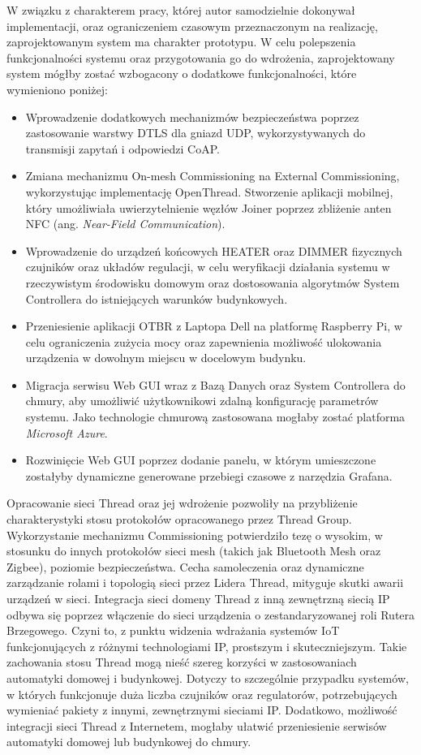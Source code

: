 W związku z charakterem pracy, której autor samodzielnie dokonywał implementacji, oraz ograniczeniem czasowym przeznaczonym na realizację, zaprojektowanym system ma charakter prototypu. W celu polepszenia funkcjonalności systemu oraz przygotowania go do wdrożenia,
zaprojektowany system mógłby zostać wzbogacony o dodatkowe funkcjonalności, które wymieniono poniżej:
\begin{itemize}
    \item Wprowadzenie dodatkowych mechanizmów bezpieczeństwa poprzez zastosowanie warstwy DTLS dla gniazd UDP, wykorzystywanych do transmisji zapytań i odpowiedzi CoAP. 
    \item Zmiana mechanizmu On-mesh Commissioning na External Commissioning, wykorzystując implementację  OpenThread. Stworzenie aplikacji mobilnej, który umożliwiała uwierzytelnienie węzłów Joiner poprzez zbliżenie anten NFC (ang. \textit{Near-Field Communication}).
    \item Wprowadzenie do urządzeń końcowych HEATER oraz DIMMER fizycznych czujników oraz układów regulacji, w celu weryfikacji działania systemu w rzeczywistym środowisku domowym oraz dostosowania algorytmów System Controllera do istniejących warunków budynkowych.
    \item Przeniesienie aplikacji OTBR z Laptopa Dell na platformę Raspberry Pi, w celu ograniczenia zużycia mocy oraz zapewnienia możliwość ulokowania urządzenia w dowolnym miejscu w docelowym budynku.
    \item Migracja serwisu Web GUI wraz z Bazą Danych oraz System Controllera do chmury, aby umożliwić użytkownikowi zdalną konfigurację parametrów systemu. Jako technologie chmurową zastosowana mogłaby zostać platforma \textit{Microsoft Azure}.
    \item Rozwinięcie Web GUI poprzez dodanie panelu, w którym umieszczone zostałyby dynamiczne generowane przebiegi czasowe z narzędzia Grafana.
\end{itemize}

Opracowanie sieci Thread oraz jej wdrożenie pozwoliły na przybliżenie charakterystyki stosu protokołów opracowanego przez Thread Group. Wykorzystanie mechanizmu Commissioning potwierdziło tezę o wysokim, w stosunku do innych protokołów sieci mesh (takich jak Bluetooth Mesh oraz Zigbee), poziomie bezpieczeństwa. Cecha samoleczenia oraz dynamiczne zarządzanie rolami i topologią sieci przez Lidera Thread, mityguje skutki awarii urządzeń w sieci. Integracja sieci domeny Thread z inną zewnętrzną siecią IP odbywa się poprzez włączenie do sieci urządzenia o zestandaryzowanej roli Rutera Brzegowego. Czyni to, z punktu widzenia wdrażania systemów IoT funkcjonujących z różnymi technologiami IP, prostszym i skuteczniejszym. Takie zachowania stosu Thread mogą nieść szereg korzyści w zastosowaniach automatyki domowej i budynkowej. Dotyczy to szczególnie przypadku systemów, w których funkcjonuje duża liczba czujników oraz regulatorów, potrzebujących wymieniać pakiety z innymi, zewnętrznymi sieciami IP. Dodatkowo, możliwość integracji sieci Thread z Internetem, mogłaby ułatwić przeniesienie serwisów automatyki domowej lub budynkowej do chmury.

